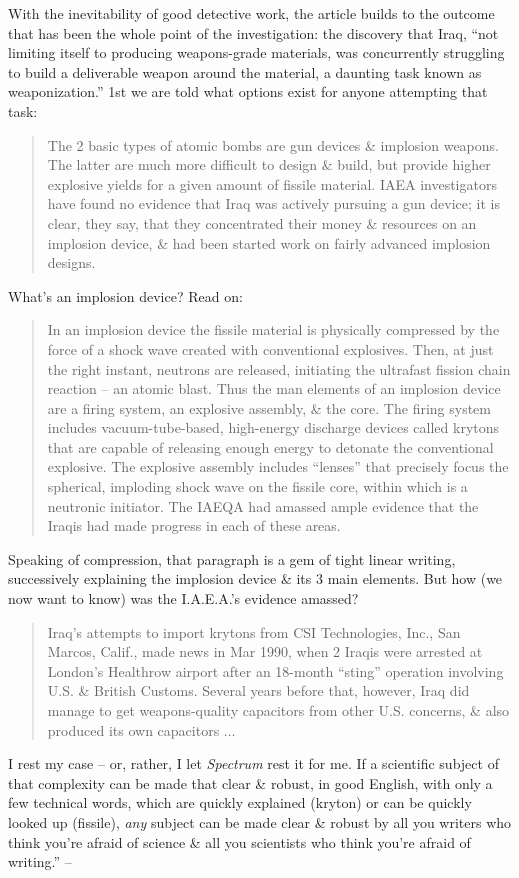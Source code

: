 \documentclass{article}
\begin{document}
With the inevitability of good detective work, the article builds to the outcome that has been the whole point of the investigation: the discovery that Iraq, ``not limiting itself to producing weapons-grade materials, was concurrently struggling to build a deliverable weapon around the material, a daunting task known as weaponization.'' 1st we are told what options exist for anyone attempting that task:
\begin{quotation}
	The 2 basic types of atomic bombs are gun devices \& implosion weapons. The latter are much more difficult to design \& build, but provide higher explosive yields for a given amount of fissile material. IAEA investigators have found no evidence that Iraq was actively pursuing a gun device; it is clear, they say, that they concentrated their money \& resources on an implosion device, \& had been started work on fairly advanced implosion designs.
\end{quotation}
What's an implosion device? Read on:
\begin{quotation}
	In an implosion device the fissile material is physically compressed by the force of a shock wave created with conventional explosives. Then, at just the right instant, neutrons are released, initiating the ultrafast fission chain reaction -- an atomic blast. Thus the man elements of an implosion device are a firing system, an explosive assembly, \& the core. The firing system includes vacuum-tube-based, high-energy discharge devices called krytons that are capable of releasing enough energy to detonate the conventional explosive. The explosive assembly includes ``lenses'' that precisely focus the spherical, imploding shock wave on the fissile core, within which is a neutronic initiator. The IAEQA had amassed ample evidence that the Iraqis had made progress in each of these areas.
\end{quotation}
Speaking of compression, that paragraph is a gem of tight linear writing, successively explaining the implosion device \& its 3 main elements. But how (we now want to know) was the I.A.E.A.'s evidence amassed?
\begin{quotation}
	Iraq's attempts to import krytons from CSI Technologies, Inc., San Marcos, Calif., made news in Mar 1990, when 2 Iraqis were arrested at London's Healthrow airport after an 18-month ``sting'' operation involving U.S. \& British Customs. Several years before that, however, Iraq did manage to get weapons-quality capacitors from other U.S. concerns, \& also produced its own capacitors $\ldots$
\end{quotation}
I rest my case -- or, rather, I let \textit{Spectrum} rest it for me. If a scientific subject of that complexity can be made that clear \& robust, in good English, with only a few technical words, which are quickly explained (kryton) or can be quickly looked up (fissile), \textit{any} subject can be made clear \& robust by all you writers who think you're afraid of science \& all you scientists who think you're afraid of writing.'' -- \cite[pp. 141--155]{Zinsser2016}
\end{document}
